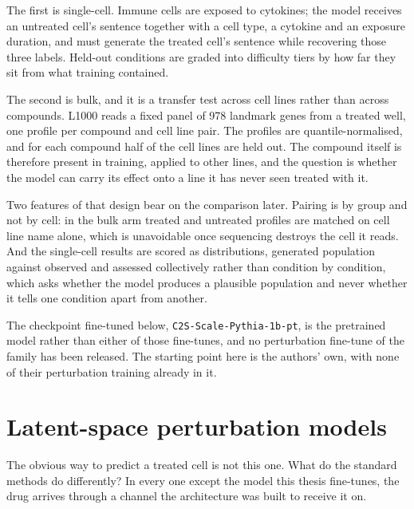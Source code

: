 The first is single-cell. Immune cells are exposed to cytokines; the model
receives an untreated cell's sentence together with a cell type, a cytokine and
an exposure duration, and must generate the treated cell's sentence while
recovering those three labels. Held-out conditions are graded into difficulty
tiers by how far they sit from what training contained.

The second is bulk, and it is a transfer test across cell lines rather than
across compounds. L1000 reads a fixed panel of 978 landmark genes from a
treated well, one profile per compound and cell line pair. The profiles are
quantile-normalised, and for each compound half of the cell lines are held out.
The compound itself is therefore present in training, applied to other lines,
and the question is whether the model can carry its effect onto a line it has
never seen treated with it.

Two features of that design bear on the comparison later. Pairing is by group
and not by cell: in the bulk arm treated and untreated profiles are matched on
cell line name alone, which is unavoidable once sequencing destroys the cell it
reads. And the single-cell results are scored as distributions, generated
population against observed and assessed collectively rather than condition by
condition, which asks whether the model produces a plausible population and
never whether it tells one condition apart from another.

The checkpoint fine-tuned below, \texttt{C2S-Scale-Pythia-1b-pt}, is the
pretrained model rather than either of those fine-tunes, and no perturbation
fine-tune of the family has been released. The starting point here is the
authors' own, with none of their perturbation training already in it.
\section{Latent-space perturbation models}
\label{sec:lit-chem}
\framedecl{-}

\begin{question}
The obvious way to predict a treated cell is not this one. What do the standard
methods do differently? In every one except the model this thesis fine-tunes, the
drug arrives through a channel the architecture was built to receive it on.
\end{question}

